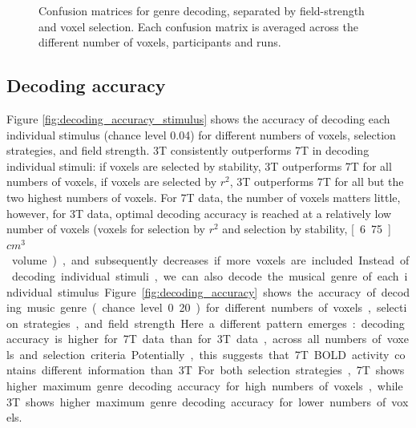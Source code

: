 \begin{figure}
  \centering
  \caption{Confusion matrices for genre decoding, separated by field-strength and voxel selection. Each confusion matrix is averaged across the different number of voxels, participants and runs.}

 \label{fig:confusion_matrices}
\end{figure}

\subsection*{Decoding accuracy}

Figure \ref{fig:decoding_accuracy_stimulus} shows the accuracy of decoding each individual stimulus (chance level 0.04) for different numbers of voxels, selection strategies, and field strength. 3T consistently outperforms 7T in decoding individual stimuli: if voxels are selected by stability, 3T outperforms 7T for all numbers of voxels, if voxels are selected by $r^{2}$, 3T outperforms 7T for all but the two highest numbers of voxels. For 7T data, the number of voxels matters little, however, for 3T data, optimal decoding accuracy is reached at a relatively low number of voxels (\unit[250]{voxels} for selection by $r^{2}$ and selection by stability, \unit[6.75]{$cm^{3}$} volume), and subsequently decreases if more voxels are included.

Instead of decoding individual stimuli, we can also decode the musical genre of each individual stimulus. Figure \ref{fig:decoding_accuracy} shows the accuracy of decoding music genre (chance level 0.20) for different numbers of voxels, selection strategies, and field strength. Here a different pattern emerges: decoding accuracy is higher for 7T data than for 3T data, across all numbers of voxels and selection criteria. Potentially, this suggests that 7T BOLD activity contains different information than 3T.  For both selection strategies, 7T shows higher maximum genre decoding accuracy for high numbers of voxels, while 3T shows higher maximum genre decoding accuracy for lower numbers of voxels.

